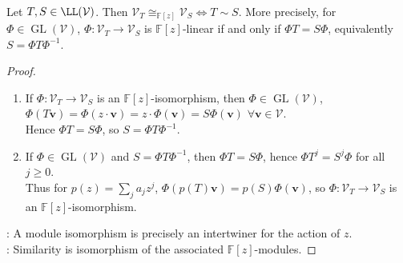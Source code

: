 \begin{theorem} \label{thm:operator-similarity-iff-module-isomorphism} \\
Let $T,S\in\LL(\mathcal{V})$. Then $\mathcal{V}_T\cong_{\mathbb{F}[z]}\mathcal{V}_S\Longleftrightarrow T\sim S$. More precisely, for $\Phi\in\operatorname{GL}(\mathcal{V})$, $\Phi:\mathcal{V}_T\to\mathcal{V}_S$ is $\mathbb{F}[z]$-linear if and only if $\Phi T=S\Phi$, equivalently $S=\Phi T\Phi^{-1}$.
\begin{proof}
\begin{enumerate}[label=\roman*.]
\setlength{\itemsep}{0pt}
\item[$(\Rightarrow)$] If $\Phi:\mathcal{V}_T\to\mathcal{V}_S$ is an $\mathbb{F}[z]$-isomorphism, then $\Phi\in\operatorname{GL}(\mathcal{V})$, $\Phi(T\mathbf{v})=\Phi(z\cdot\mathbf{v})=z\cdot\Phi(\mathbf{v})=S\Phi(\mathbf{v})$ $\forall \mathbf{v}\in\mathcal{V}$.\\
Hence $\Phi T=S\Phi$, so $S=\Phi T\Phi^{-1}$.
\item[$(\Leftarrow)$] If $\Phi\in\operatorname{GL}(\mathcal{V})$ and $S=\Phi T\Phi^{-1}$, then $\Phi T=S\Phi$, hence $\Phi T^j=S^j\Phi$ for all $j\geq0$.\\
Thus for $p(z)=\sum_ja_jz^j$, $\Phi(p(T)\mathbf{v})=p(S)\Phi(\mathbf{v})$, so $\Phi:\mathcal{V}_T\to\mathcal{V}_S$ is an $\mathbb{F}[z]$-isomorphism.
\end{enumerate}
: A module isomorphism is precisely an intertwiner for the action of $z$.\\
: Similarity is isomorphism of the associated $\mathbb{F}[z]$-modules.
\end{proof}
\end{theorem}

